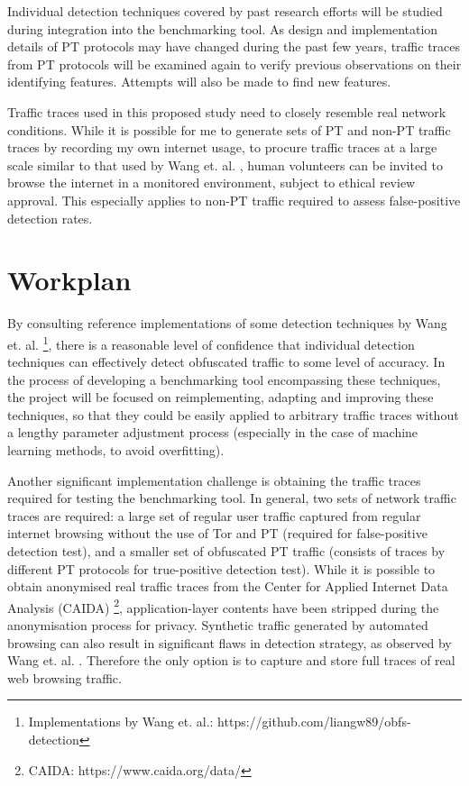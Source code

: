 \documentclass[11pt]{article}
\begin{document}
Individual detection techniques covered by past research efforts will be studied during integration into the benchmarking tool. As design and implementation details of PT protocols may have changed during the past few years, traffic traces from PT protocols will be examined again to verify previous observations on their identifying features. Attempts will also be made to find new features.

Traffic traces used in this proposed study need to closely resemble real network conditions. While it is possible for me to generate sets of PT and non-PT traffic traces by recording my own internet usage, to procure traffic traces at a large scale similar to that used by Wang et. al. \cite{wang2015seeing}, human volunteers can be invited to browse the internet in a monitored environment, subject to ethical review approval. This especially applies to non-PT traffic required to assess false-positive detection rates.


\section{Workplan}

By consulting reference implementations of some detection techniques by Wang et. al. \cite{wang2015seeing} \footnote{Implementations by Wang et. al.: https://github.com/liangw89/obfs-detection}, there is a reasonable level of confidence that individual detection techniques can effectively detect obfuscated traffic to some level of accuracy.  In the process of developing a benchmarking tool encompassing these techniques, the project will be focused on reimplementing, adapting and improving these techniques, so that they could be easily applied to arbitrary traffic traces without a lengthy parameter adjustment process (especially in the case of machine learning methods, to avoid overfitting). 

Another significant implementation challenge is obtaining the traffic traces required for testing the benchmarking tool. In general, two sets of network traffic traces are required: a large set of regular user traffic captured from regular internet browsing without the use of Tor and PT (required for false-positive detection test), and a smaller set of obfuscated PT traffic (consists of traces by different PT protocols for true-positive detection test). While it is possible to obtain anonymised real traffic traces from the Center for Applied Internet Data Analysis (CAIDA) \footnote{CAIDA: https://www.caida.org/data/}, application-layer contents have been stripped during the anonymisation process for privacy. Synthetic traffic generated by automated browsing can also result in significant flaws in detection strategy, as observed by Wang et. al. \cite[Sec. 6.1]{wang2015seeing}. Therefore the only option is to capture and store full traces of real web browsing traffic.
\end{document}
